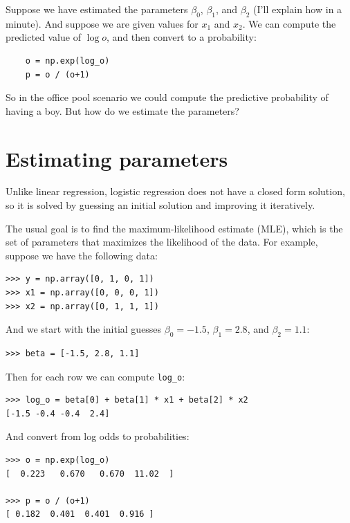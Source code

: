 \documentclass[12pt]{book}
\begin{document}
Suppose we have estimated the parameters $\beta_0$, $\beta_1$, and
$\beta_2$ (I'll explain how in a minute).  And suppose we are given
values for $x_1$ and $x_2$.  We can compute the predicted value of
$\log o$, and then convert to a probability:

\begin{verbatim}
    o = np.exp(log_o)
    p = o / (o+1)
\end{verbatim}

So in the office pool scenario we could compute the predictive
probability of having a boy.  But how do we estimate the parameters?


\section{Estimating parameters}

Unlike linear regression, logistic regression does not have a
closed form solution, so it is solved by guessing an initial
solution and improving it iteratively.

The usual goal is to find the maximum-likelihood estimate (MLE),
which is the set of parameters that maximizes the likelihood of the
data.  For example, suppose we have the following data:

\begin{verbatim}
>>> y = np.array([0, 1, 0, 1])
>>> x1 = np.array([0, 0, 0, 1])
>>> x2 = np.array([0, 1, 1, 1])
\end{verbatim}

And we start with the initial guesses $\beta_0=-1.5$, $\beta_1=2.8$,
and $\beta_2=1.1$:

\begin{verbatim}
>>> beta = [-1.5, 2.8, 1.1]
\end{verbatim}

Then for each row we can compute \verb"log_o":

\begin{verbatim}
>>> log_o = beta[0] + beta[1] * x1 + beta[2] * x2 
[-1.5 -0.4 -0.4  2.4]
\end{verbatim}

And convert from log odds to probabilities:

\begin{verbatim}
>>> o = np.exp(log_o)
[  0.223   0.670   0.670  11.02  ]

>>> p = o / (o+1)
[ 0.182  0.401  0.401  0.916 ]
\end{verbatim}
\end{document}
